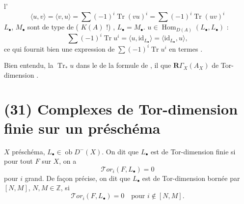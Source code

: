 \documentclass[11pt,a4paper]{article}
\begin{document}
  
 l'
\[
  \langle u, v \rangle = \langle v, u \rangle
  = \sum (-1)^i \operatorname{Tr}(vu)^i = \sum (-1)^i \operatorname{Tr}(uv)^i
\]
 $L_\bullet$, $M_\bullet$ sont \struck{\ill{}}
 de type   de  \ill{}  (
$K(A)$ !) 
 \ill{} \ill{}
 , \ill{} \ill{} \ill{}
$L_\bullet = M_\bullet$. \ill{} 
$u \in \operatorname{Hom}_{D(A)}(L_\bullet, L_\bullet)$ :
\[
  \sum (-1)^i \operatorname{Tr} u^i = \langle u, \mathrm{id}_{L_\bullet}
  \rangle = \langle \mathrm{id}_{L_\bullet}, u \rangle ,
\]
ce qui fournit bien une expression de $\sum (-1)^i \operatorname{Tr} u^i$
en termes .

Bien entendu,   
la  $\operatorname{Tr}_* u$ dans le
  de la formule de
, il   que
$\mathbf{R}\Gamma_X(A_X)$  
de Tor-dimension . \ill{} \ill{} \ill{} \ill{} \ill{}
 


\section{(31) Complexes de Tor-dimension finie sur un préschéma}

$X$ préschéma, $L_\bullet \in \operatorname{ob} D^-(X)$. On dit que
 $L_\bullet$ est de Tor-dimension finie si pour tout
  $F$ sur $X$, on a
\[
  \mathcal{T}or_i(F, L_\bullet) = 0
\]
pour \struck{\ill{}} $i$ grand. De façon précise, on dit que $L_\bullet$
est de \struck{\ill{}} Tor-dimension bornée par $[N, M]$,
\struck{\ill{}} $N, M \in \mathbb{Z}$, si
\[
  \mathcal{T}or_i(F, L_\bullet) = 0 \quad \text{pour } i \notin [N, M] .
\]
\end{document}
